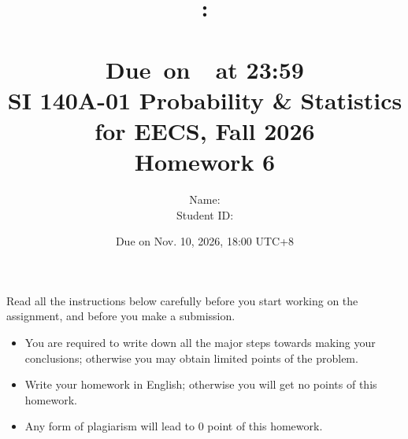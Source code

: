 \documentclass[a4paper]{article}
\title{
	\vspace{2in}
	\textmd{\textbf{\hmwkClass:\\  \hmwkTitle}}\\
	\normalsize\vspace{0.1in}\small{Due\ on\ \hmwkDueDate\ at 23:59}\\
	\vspace{4in}
}
\author{
	Name: \textbf{\hmwkAuthorName} \\
	Student ID: \hmwkAuthorID}
\date{}
\begin{document}
	
	
	
	\date{
		Due on Nov. 10, 2026, 18:00 UTC+8}
	\title{SI 140A-01  Probability \& Statistics for EECS, Fall 2026 \\
		Homework 6}
	\maketitle
	Read all the instructions below carefully before you start working on the assignment, and before you make a submission.
	\begin{itemize}
		\item You are required to write down all the major steps towards making your conclusions; otherwise you may obtain limited points of the problem.
		\item Write your homework in English; otherwise you will get no points of this homework.
		\item Any form of plagiarism will lead to $0$ point of this homework. 
	\end{itemize}
	
	
	
	\newpage
  
\end{document}
